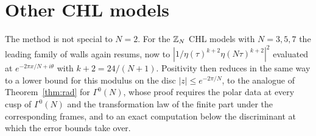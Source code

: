 \section{Other CHL models}\label{sec:remains}

The method is not special to $N=2$. For the $\mathbb{Z}_N$ CHL models with $N=3,5,7$ the leading family of walls again resums, now to $|1/\eta(\tau)^{k+2}\eta(N\tau)^{k+2}|^2$ evaluated at $e^{-2\pi x/N+i\theta}$ with $k+2=24/(N+1)$. Positivity then reduces in the same way to a lower bound for this modulus on the disc $|z|\le e^{-2\pi/N}$, to the analogue of Theorem~\ref{thm:rad} for $\Gamma^0(N)$, whose proof requires the polar data at every cusp of $\Gamma^0(N)$ and the transformation law of the finite part under the corresponding frames, and to an exact computation below the discriminant at which the error bounds take over.

